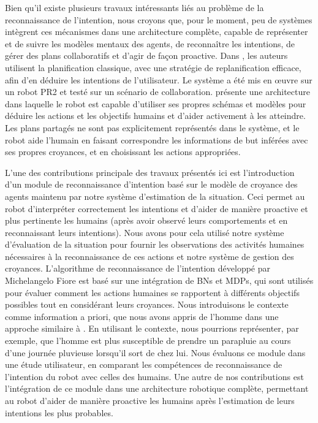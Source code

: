 \documentclass[a4paper,11pt,twoside]{StyleThese}
\begin{document}
Bien qu'il existe plusieurs travaux intéressants liés au problème de la reconnaissance de l'intention, nous croyons que, pour le moment, peu de systèmes intègrent ces mécanismes dans une architecture complète, capable de représenter et de suivre les modèles mentaux des agents, de reconnaître les intentions, de gérer des plans collaboratifs et d'agir de façon proactive. Dans \cite{talamadupula2014coordination}, les auteurs utilisent la planification classique, avec une stratégie de replanification efficace, afin d'en déduire les intentions de l'utilisateur. Le système a été mis en œuvre sur un robot PR2 et testé sur un scénario de collaboration. \cite{BreazealGB09} présente une architecture dans laquelle le robot est capable d'utiliser ses propres schémas et modèles pour déduire les actions et les objectifs humains et d'aider activement à les atteindre. Les plans partagés ne sont pas explicitement représentés dans le système, et le robot aide l'humain en faisant correspondre les informations de but inférées avec ses propres croyances, et en choisissant les actions appropriées.

L'une des contributions principale des travaux présentés ici est l'introduction d'un module de reconnaissance d'intention basé sur le modèle de croyance des agents maintenu par notre système d'estimation de la situation. Ceci permet au robot d'interpréter correctement les intentions et d'aider de manière proactive et plus pertinente les humains (après avoir observé leurs comportements et en reconnaissant leurs intentions).
Nous avons pour cela utilisé notre système d'évaluation de la situation pour fournir les observations des activités humaines nécessaires à la reconnaissance de ces actions et notre système de gestion des croyances.
L'algorithme de reconnaissance de l'intention développé par Michelangelo Fiore est basé sur une intégration de BNs et MDPs, qui sont utilisés pour évaluer comment les actions humaines se rapportent à différents objectifs possibles tout en considérant leurs croyances. Nous introduisons le contexte comme information a priori, que nous avons appris de l'homme dans une approche similaire à \cite{Liu2014}. En utilisant le contexte, nous pourrions représenter, par exemple, que l'homme est plus susceptible de prendre un parapluie au cours d'une journée pluvieuse lorsqu'il sort de chez lui. Nous évaluons ce module dans une étude utilisateur, en comparant les compétences de reconnaissance de l'intention du robot avec celles des humains. Une autre de nos contributions est l'intégration de ce module dans une architecture robotique complète, permettant au robot d'aider de manière proactive les humains après l'estimation de leurs intentions les plus probables.
\end{document}
